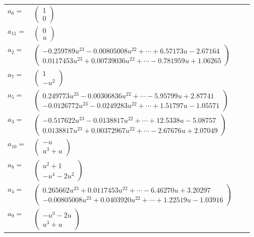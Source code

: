 \documentclass[1p]{elsarticle_modified}
\theoremstyle{definition}
\begin{document}
\begin{tabular}{m{7pt} m{180pt} m{7pt} m{180pt} }
\flushright $a_{6}=$&$\begin{pmatrix}1\\0\end{pmatrix}$ \\
\flushright $a_{11}=$&$\begin{pmatrix}0\\u\end{pmatrix}$ \\
\flushright $a_{2}=$&$\begin{pmatrix}-0.259789 u^{23}-0.00805008 u^{22}+\cdots+6.57173 u-2.67164\\0.0117453 u^{23}+0.00739036 u^{22}+\cdots-0.781959 u+1.06265\end{pmatrix}$ \\
\flushright $a_{7}=$&$\begin{pmatrix}1\\- u^2\end{pmatrix}$ \\
\flushright $a_{5}=$&$\begin{pmatrix}0.249773 u^{23}-0.00306836 u^{22}+\cdots-5.95799 u+2.87741\\-0.0126772 u^{23}-0.0249283 u^{22}+\cdots+1.51797 u-1.05571\end{pmatrix}$ \\
\flushright $a_{3}=$&$\begin{pmatrix}-0.517622 u^{23}-0.0138817 u^{22}+\cdots+12.5338 u-5.08757\\0.0138817 u^{23}+0.00372967 u^{22}+\cdots-2.67676 u+2.07049\end{pmatrix}$ \\
\flushright $a_{10}=$&$\begin{pmatrix}- u\\u^3+u\end{pmatrix}$ \\
\flushright $a_{8}=$&$\begin{pmatrix}u^2+1\\- u^4-2 u^2\end{pmatrix}$ \\
\flushright $a_{4}=$&$\begin{pmatrix}0.265662 u^{23}+0.0117453 u^{22}+\cdots-6.46270 u+3.20297\\-0.00805008 u^{23}+0.0403920 u^{22}+\cdots+1.22519 u-1.03916\end{pmatrix}$ \\
\flushright $a_{9}=$&$\begin{pmatrix}- u^3-2 u\\u^3+u\end{pmatrix}$ \\

\end{tabular}
\end{document}
